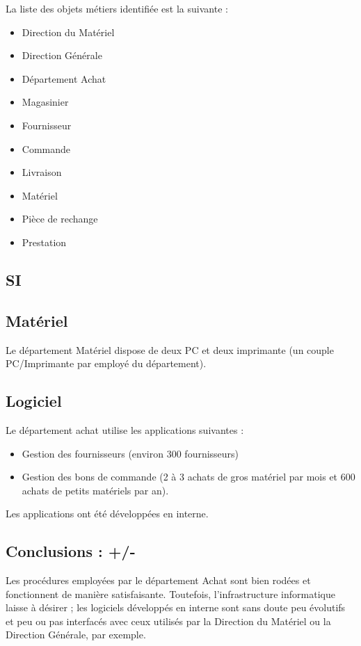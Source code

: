 \documentclass[a4paper]{article}
\begin{document}
La liste des objets métiers identifiée est la suivante :

\begin{itemize}
\item Direction du Matériel
\item Direction Générale
\item Département Achat
\item Magasinier
\item Fournisseur
\item Commande
\item Livraison
\item Matériel
\item Pièce de rechange
\item Prestation
\end{itemize}


\subsection{SI}

\subsection{Matériel}
Le département Matériel dispose de deux PC et deux imprimante (un couple
PC/Imprimante par employé du département).

\subsection{Logiciel}
Le département achat utilise les applications suivantes :
\begin{itemize}
\item Gestion des fournisseurs (environ 300 fournisseurs)
\item Gestion des bons de commande (2 à 3 achats de gros matériel par mois
et 600 achats de petits matériels par an).
\end{itemize}

Les applications ont été développées en interne.


\subsection{Conclusions : +/-}

Les procédures employées par le département Achat sont bien rodées et
fonctionnent de manière satisfaisante. Toutefois, l'infrastructure
informatique laisse à désirer ; les logiciels développés en interne sont
sans doute peu évolutifs et peu ou pas interfacés avec ceux utilisés par la
Direction du Matériel ou la Direction Générale, par exemple.
\end{document}

